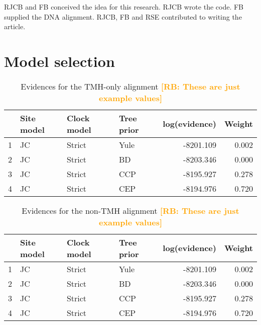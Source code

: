\documentclass{article}
\newcommand{\richel}[1]{\textcolor{orange}{\textbf{[RB: #1]}}}
\begin{document}
RJCB and FB conceived the idea for this research. 
RJCB wrote the code.
FB supplied the DNA alignment.
RJCB, FB and RSE contributed to writing the article.




\appendix

\section{Model selection}

\begin{table}[ht]
\centering
\begin{tabular}{rlllrr}
  \hline
 & Site model & Clock model & Tree prior & log(evidence) & Weight \\ 
  \hline
1 & JC & Strict & Yule & -8201.109 & 0.002 \\ 
  2 & JC & Strict & BD & -8203.346 & 0.000 \\ 
  3 & JC & Strict & CCP & -8195.927 & 0.278 \\ 
  4 & JC & Strict & CEP & -8194.976 & 0.720 \\ 
   \hline
\end{tabular}
\caption{
  Evidences for the TMH-only alignment
  \richel{These are just example values}
} 
\label{tab:evidences_tmh}
\end{table}

\begin{table}[ht]
\centering
\begin{tabular}{rlllrr}
  \hline
 & Site model & Clock model & Tree prior & log(evidence) & Weight \\ 
  \hline
1 & JC & Strict & Yule & -8201.109 & 0.002 \\ 
  2 & JC & Strict & BD & -8203.346 & 0.000 \\ 
  3 & JC & Strict & CCP & -8195.927 & 0.278 \\ 
  4 & JC & Strict & CEP & -8194.976 & 0.720 \\ 
   \hline
\end{tabular}
\caption{
  Evidences for the non-TMH alignment
  \richel{These are just example values}
} 
\label{tab:evidences_non_tmh}
\end{table}
\end{document}
